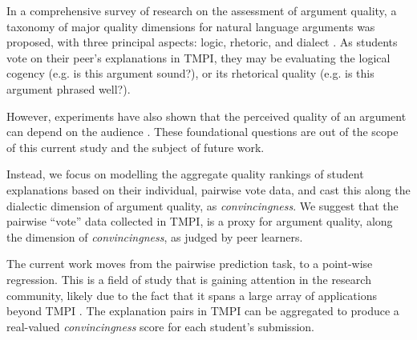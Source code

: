 \documentclass[notitlepage,12pt]{jedm}
\begin{document}
In a comprehensive survey of research on the assessment of argument quality, a 
taxonomy of major quality dimensions for natural language arguments was 
proposed, with three principal aspects: logic, rhetoric, and dialect 
\cite{wachsmuth_computational_2017}. 
As students vote on their peer's explanations in TMPI, they may be evaluating 
the logical cogency (e.g. is this argument sound?), or its rhetorical quality 
(e.g. is this argument phrased well?). 

However, experiments have also shown that the perceived quality of an argument 
can depend on the audience \cite{mercier_why_2011}. 
These foundational questions are out of the scope of this current study and 
the subject of future work. 

Instead, we focus on modelling the aggregate quality rankings of student explanations 
based on their individual, pairwise vote data, and cast this along the dialectic 
dimension of argument quality, as \textit{convincingness}. We suggest that the pairwise ``vote'' data collected in TMPI, is a proxy for argument quality, along the dimension of 
\textit{convincingness}, as judged by peer learners. 


The current work moves from the pairwise prediction task, to 
a point-wise regression.  This is a field of study that is gaining attention
in the research community, likely due to the fact that it spans a large
array of applications beyond TMPI \cite{melnikov2016pairwise}. 
The explanation pairs in TMPI can be aggregated to produce a real-valued 
\textit{convincingness} score for each student's submission. 

\end{document}
